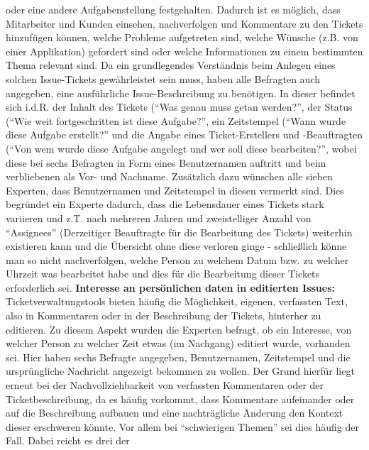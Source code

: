 oder eine andere Aufgabenstellung festgehalten. \newline Dadurch ist es möglich, dass Mitarbeiter und Kunden einsehen, nachverfolgen und Kommentare zu den Tickets hinzufügen können, welche Probleme aufgetreten sind, welche Wünsche (z.B. von einer Applikation) gefordert sind oder welche Informationen zu einem bestimmten Thema relevant sind. Da ein grundlegendes Verständnis beim
Anlegen eines solchen Issue-Tickets gewährleistet sein muss, haben alle Befragten auch angegeben, eine ausführliche Issue-Beschreibung zu benötigen. In dieser befindet sich i.d.R. der Inhalt des Tickets (\enquote{Was genau muss getan werden?}, der Status (\enquote{Wie weit fortgeschritten ist diese Aufgabe?}, ein Zeitstempel (\enquote{Wann wurde diese Aufgabe erstellt?} 
und die Angabe eines Ticket-Erstellers und -Beauftragten (\enquote{Von wem wurde diese Aufgabe angelegt und wer soll diese bearbeiten?}, wobei diese bei sechs Befragten in Form eines Benutzernamen auftritt und beim verbliebenen als Vor- und Nachname. \newline Zusätzlich dazu wünschen alle sieben Experten, dass Benutzernamen und Zeitstempel in diesen vermerkt sind. Dies begründet ein 
Experte dadurch, dass die Lebensdauer eines Tickets stark variieren und z.T. nach mehreren Jahren und zweistelliger Anzahl von \enquote{Assignees} (Derzeitiger Beauftragte für die Bearbeitung des Tickets) weiterhin existieren kann und die Übersicht ohne diese verloren ginge - schließlich könne man so nicht nachverfolgen, welche Person zu welchem Datum bzw. zu welcher Uhrzeit 
was bearbeitet habe und dies für die Bearbeitung dieser Tickets erforderlich sei. \newline \newline
\textbf{Interesse an persönlichen daten in editierten Issues:} \newline \label{comments}
Ticketverwaltungstools bieten häufig die Möglichkeit, eigenen, verfassten Text, also in Kommentaren oder in der Beschreibung der Tickets, hinterher zu editieren. Zu diesem Aspekt wurden die Experten befragt, ob ein Interesse, von welcher Person zu welcher Zeit etwas (im Nachgang) editiert wurde, vorhanden sei. \newline Hier haben sechs Befragte angegeben, Benutzernamen, Zeitstempel und die ursprüngliche Nachricht
angezeigt bekommen zu wollen. Der Grund hierfür liegt erneut bei der Nachvollziehbarkeit von verfassten Kommentaren oder der Ticketbeschreibung, da es häufig vorkommt, dass Kommentare aufeinander oder auf die Beschreibung aufbauen und eine nachträgliche Änderung den Kontext dieser erschweren könnte. Vor allem bei \enquote{schwierigen Themen} sei dies häufig der Fall. \newline Dabei reicht es drei der
